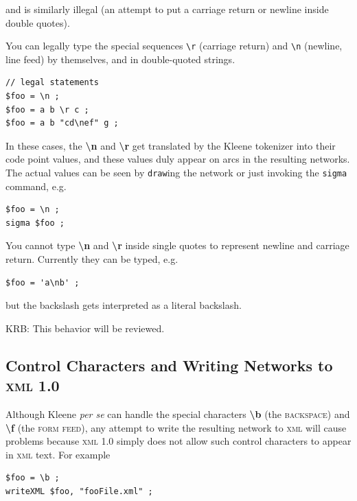 \documentclass[letterpaper,12pt]{article}
\newcommand{\acro}{\textsc}
\begin{document}
\noindent
and is similarly illegal (an attempt to put a carriage return or newline
inside double quotes).  

You can legally type the special sequences \texttt{\textbackslash{}r}
(carriage return) and \texttt{\textbackslash{}n} (newline, line feed) by
themselves, and in double-quoted strings.

\begin{Verbatim}[fontsize=\small]
// legal statements
$foo = \n ;
$foo = a b \r c ;
$foo = a b "cd\nef" g ;
\end{Verbatim}

\noindent
In these cases, the \textbf{\textbackslash{}n} and
\textbf{\textbackslash{}r} get translated by the Kleene tokenizer into
their code point values, and these values duly appear on arcs in the
resulting networks.  The actual values can be seen by \texttt{draw}ing
the network or just invoking the \texttt{sigma} command, e.g.

\begin{Verbatim}[fontsize=\small]
$foo = \n ;
sigma $foo ;
\end{Verbatim}

You cannot type \textbf{\textbackslash{}n} and \textbf{\textbackslash{}r}
inside single quotes to represent newline and carriage return.  Currently
they can be typed, e.g.

\begin{Verbatim}[fontsize=\small]
$foo = 'a\nb' ;
\end{Verbatim}

\noindent

but the backslash gets interpreted as a literal backslash.  

KRB:  This
behavior will be reviewed.

\subsection{Control Characters and Writing Networks to \acro{xml} 1.0}

Although Kleene \emph{per se} can handle the special characters
\textbf{\textbackslash{}b} (the \acro{backspace}) and
\textbf{\textbackslash{}f} (the \acro{form feed}), any attempt to write
the resulting network to \acro{xml} will cause problems because
\acro{xml} 1.0 simply does not allow such control characters to appear in
\acro{xml} text.  For example

\begin{Verbatim}[fontsize=\small]
$foo = \b ;
writeXML $foo, "fooFile.xml" ;
\end{Verbatim}
\end{document}
